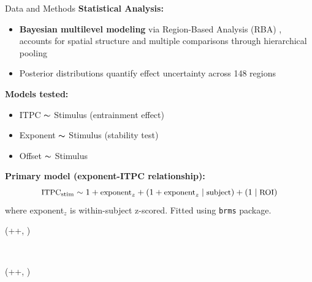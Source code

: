 \documentclass{beamer}
\newlength{\blockThree}
\newcommand{\mynum}[1]{\scalebox{1.075}{\firasemibold#1}}
\begin{document}
\begin{frame}[t]
\begin{textblock*}{\colwidth}
\begin{block}{ Data and Methods}
    \textbf{Statistical Analysis:}
    \begin{itemize}
        \item \textbf{Bayesian multilevel modeling} via Region-Based Analysis (RBA) \citep{chen2019a}, accounts for spatial structure and multiple comparisons through hierarchical pooling
        \item Posterior distributions quantify effect uncertainty across 148 regions
    \end{itemize}
    
    \textbf{Models tested:}
    \begin{itemize}
        \item[\mynum{1}] ITPC $\thicksim$ Stimulus (entrainment effect)
        \item[\mynum{2}] Exponent $\thicksim$ Stimulus (stability test)
        \item[\mynum{3}] Offset $\thicksim$ Stimulus
    \end{itemize}
    
    \textbf{Primary model (exponent-ITPC relationship):}
    $${\small \text{ITPC}_{\text{stim}} \sim 1 + \text{exponent}_z + (1 + \text{exponent}_z \mid \text{subject}) + (1 \mid \text{ROI})}$$
    where exponent$_z$ is within-subject z-scored. Fitted using \texttt{brms} package.
\end{block}

\end{textblock*}





\begin{textblock*}{\colwidth}(\leftmargin+\colwidth+\colsep, \blockThree-150pt)

	\begin{block}{~}
		\vspace{-0.333333\baselineskip}
		
	\end{block}
\end{textblock*}


\begin{textblock*}{\colwidth}(\leftmargin+\colwidth+\colsep, \blockThree-150pt)

	

\end{textblock*}
\end{frame}
\end{document}
